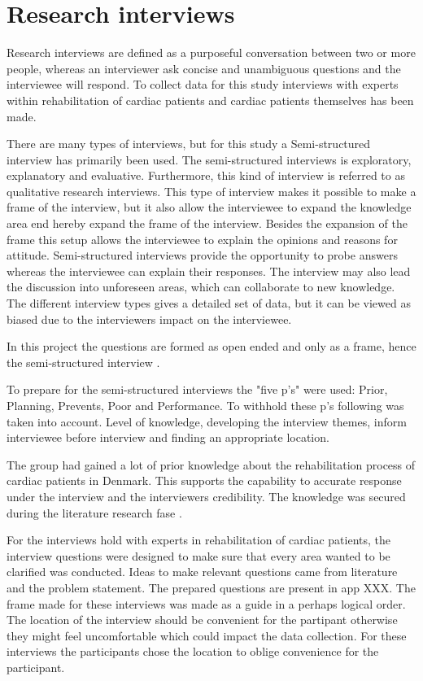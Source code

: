 
\section{Research interviews}
\label{qualitative}

Research interviews are defined as a purposeful conversation between two or more people, whereas an interviewer ask concise and unambiguous questions and the interviewee will respond. To collect data for this study interviews with experts within rehabilitation of  cardiac patients and cardiac patients themselves has been made. 

There are many types of interviews, but for this study a Semi-structured interview has primarily been used. The semi-structured interviews is exploratory, explanatory and evaluative. Furthermore, this kind of interview is referred to as qualitative research interviews.
This type of interview makes it possible to make a frame of the interview, but it also allow the interviewee to expand the knowledge area end hereby expand the frame of the interview. Besides the expansion of the frame this setup allows the interviewee to explain the opinions and reasons for attitude. Semi-structured interviews provide the opportunity to probe answers whereas the interviewee can explain their responses. The interview may also lead the discussion into unforeseen areas, which can collaborate to new knowledge. The different interview types gives a detailed set of data, but it can be viewed as biased due to the interviewers impact on the interviewee. 

In this project the questions are formed as open ended and only as a frame, hence the semi-structured interview \cite{mark2009research}.

To prepare for the semi-structured interviews the "five p's" were used: Prior, Planning, Prevents, Poor and Performance. To withhold these p's following was taken into account. Level of knowledge, developing the interview themes, inform interviewee before interview and finding an appropriate location. 

The group had gained a lot of prior knowledge about the rehabilitation process of cardiac patients in Denmark. This supports the capability to accurate response under the interview and the interviewers credibility. The knowledge was secured during the literature research fase \cite{mark2009research}. 

For the interviews hold with experts in rehabilitation of cardiac patients, the interview questions were designed to make sure that every area wanted to be clarified was conducted. Ideas to make relevant questions came from literature and the problem statement. The prepared questions are present in app XXX. The frame made for these interviews was made as a guide in a perhaps logical order. The location of the interview should be convenient for the partipant otherwise they might feel uncomfortable which could impact the data collection. For these interviews the participants chose the location to oblige convenience for the participant. 

